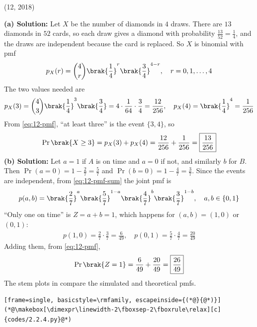 \begin{enumerate}[label=\thesubsection.\arabic*, ref=\thesubsection.\theenumi]
\par\hfill (12, 2018)\par
\textbf{(a) Solution:} Let $X$ be the number of diamonds in $4$ draws. There are $13$ diamonds in $52$ cards, so each draw gives a diamond with probability $\frac{13}{52} = \frac{1}{4}$, and the draws are independent because the card is replaced. So $X$ is binomial with pmf
\begin{align}
p_X(r) = \binom{4}{r}\brak{\frac{1}{4}}^r\brak{\frac{3}{4}}^{4-r}, \quad r = 0, 1, \ldots, 4
\end{align}
The two values needed are
\begin{align*}
p_X(3) = \binom{4}{3}\brak{\frac{1}{4}}^3\brak{\frac{3}{4}} = 4 \cdot \frac{1}{64} \cdot \frac{3}{4} = \frac{12}{256}, \quad
p_X(4) = \brak{\frac{1}{4}}^4 = \frac{1}{256}
\end{align*}
From \eqref{eq:12-pmf}, ``at least three'' is the event $\{3, 4\}$, so
\begin{align}
\Pr\brak{X \geq 3} = p_X(3) + p_X(4) = \frac{12}{256} + \frac{1}{256} = \boxed{\frac{13}{256}}
\end{align}
\textbf{(b) Solution:} Let $a = 1$ if $A$ is on time and $a = 0$ if not, and similarly $b$ for $B$. Then $\Pr(a = 0) = 1 - \frac{2}{7} = \frac{5}{7}$ and $\Pr(b = 0) = 1 - \frac{4}{7} = \frac{3}{7}$. Since the events are independent, from \eqref{eq:12-pmf-sum} the joint pmf is
\begin{align}
p(a, b) = \brak{\frac{2}{7}}^a\brak{\frac{5}{7}}^{1-a}\brak{\frac{4}{7}}^b\brak{\frac{3}{7}}^{1-b}, \quad a, b \in \{0, 1\}
\end{align}
``Only one on time'' is $Z = a + b = 1$, which happens for $(a,b) = (1,0)$ or $(0,1)$:
\begin{align*}
p(1,0) = \frac{2}{7}\cdot\frac{3}{7} = \frac{6}{49}, \quad p(0,1) = \frac{5}{7}\cdot\frac{4}{7} = \frac{20}{49}
\end{align*}
Adding them, from \eqref{eq:12-pmf},
\begin{align}
\Pr\brak{Z = 1} = \frac{6}{49} + \frac{20}{49} = \boxed{\frac{26}{49}}
\end{align}
The stem plots in  compare the simulated and theoretical pmfs.
\begin{lstlisting}[frame=single, basicstyle=\rmfamily, escapeinside={(*@}{@*)}]
(*@\makebox[\dimexpr\linewidth-2\fboxsep-2\fboxrule\relax][c]{codes/2.2.4.py}@*)

\end{lstlisting}
\end{enumerate}
